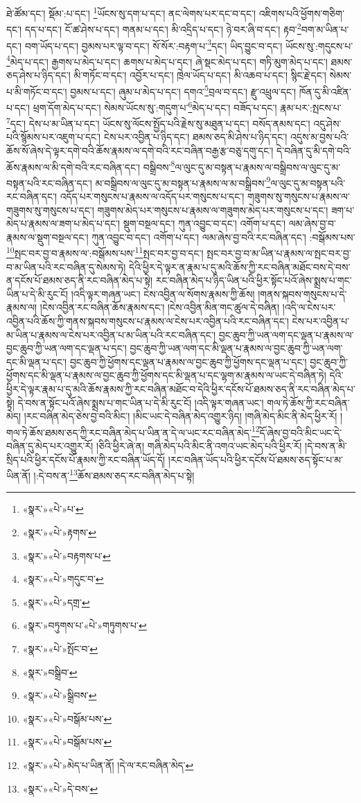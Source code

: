 ཐེ་ཚོམ་དང་། སྡོམ་:པ་དང་། \footnote{«སྣར་»«པེ་»པ་}ཡོངས་སུ་དག་པ་དང་། ནང་ལེགས་པར་དང་བ་དང་། འཇིགས་པའི་ཕྱོགས་གཅིག་དང་། དད་པ་དང་། ངོ་ཚ་ཤེས་པ་དང་། གནམ་པ་དང་། མི་འདྲིད་པ་དང་། ཉེ་བར་ཞི་བ་དང་། རྟབ་\footnote{«སྣར་»«པེ་»རྟགས་}བག་མ་ཡིན་པ་དང་། བག་ཡོད་པ་དང་། བྱམས་པར་ལྟ་བ་དང་། སོ་སོར་:བརྟག་པ་\footnote{«སྣར་»«པེ་»བརྟགས་པ་}དང་། ཡིད་བྱུང་བ་དང་། ཡོངས་སུ་:གདུངས་པ་\footnote{«སྣར་»«པེ་»གདུང་བ་}མེད་པ་དང་། རྒྱགས་པ་མེད་པ་དང་། ཆགས་པ་མེད་པ་དང་། ཞེ་སྡང་མེད་པ་དང་། གཏི་མུག་མེད་པ་དང་། ཐམས་ཅད་ཤེས་པ་ཉིད་དང་། མི་གཏོང་བ་དང་། འབྱོར་པ་དང་། ཁྲེལ་ཡོད་པ་དང་། མི་འཆབ་པ་དང་། སྙིང་རྗེ་དང་། སེམས་པ་མི་གཏོང་བ་དང་། བྱམས་པ་དང་། ཞུམ་པ་མེད་པ་དང་། དགའ་\footnote{«སྣར་»«པེ་»དགྲ་}བྲལ་བ་དང་། རྫུ་འཕྲུལ་དང་། ཁོན་དུ་མི་འཛིན་པ་དང་། ཕྲག་དོག་མེད་པ་དང་། སེམས་ཡོངས་སུ་:གདུག་པ་\footnote{«སྣར་»བཏུགས་པ་«པེ་»གཏུགས་པ་}མེད་པ་དང་། བཟོད་པ་དང་། རྣམ་པར་:སྤངས་པ་\footnote{«སྣར་»«པེ་»སྤོང་བ་}དང་། དེས་པ་མ་ཡིན་པ་དང་། ཡོངས་སུ་ལོངས་སྤྱོད་པའི་རྗེས་སུ་མཐུན་པ་དང་། བསོད་ནམས་དང་། འདུ་ཤེས་པའི་སྙོམས་པར་འཇུག་པ་དང་། ངེས་པར་འབྱིན་པ་ཉིད་དང་། ཐམས་ཅད་མི་ཤེས་པ་ཉིད་དང་། འདུས་མ་བྱས་པའི་ཆོས་སོ་ཞེས་དེ་ལྟར་དགེ་བའི་ཆོས་རྣམས་ལ་དགེ་བའི་རང་བཞིན་བརྒྱ་རྩ་བཅུ་དགུ་དང་། དེ་བཞིན་དུ་མི་དགེ་བའི་ཆོས་རྣམས་ལ་མི་དགེ་བའི་རང་བཞིན་དང་། བསྒྲིབས་\footnote{«སྣར་»བསྒྲིབ་}ལ་ལུང་དུ་མ་བསྟན་པ་རྣམས་ལ་བསྒྲིབས་ལ་ལུང་དུ་མ་བསྟན་པའི་རང་བཞིན་དང་། མ་བསྒྲིབས་ལ་ལུང་དུ་མ་བསྟན་པ་རྣམས་ལ་མ་བསྒྲིབས་\footnote{«སྣར་»«པེ་»སྒྲིབས་}ལ་ལུང་དུ་མ་བསྟན་པའི་རང་བཞིན་དང་། འདོད་པར་གསུངས་པ་རྣམས་ལ་འདོད་པར་གསུངས་པ་དང་། གཟུགས་སུ་གསུངས་པ་རྣམས་ལ་གཟུགས་སུ་གསུངས་པ་དང་། གཟུགས་མེད་པར་གསུངས་པ་རྣམས་ལ་གཟུགས་མེད་པར་གསུངས་པ་དང་། ཟག་པ་མེད་པ་རྣམས་ལ་ཟག་པ་མེད་པ་དང་། སྡུག་བསྔལ་དང་། ཀུན་འབྱུང་བ་དང་། འགོག་པ་དང་། ལམ་ཞེས་བྱ་བ་རྣམས་ལ་སྡུག་བསྔལ་དང་། ཀུན་འབྱུང་བ་དང་། འགོག་པ་དང་། ལམ་ཞེས་བྱ་བའི་རང་བཞིན་དང་། :བསྒོམས་པས་\footnote{«སྣར་»«པེ་»བསྒོམ་པས་}སྤང་བར་བྱ་བ་རྣམས་ལ་:བསྒོམས་པས་\footnote{«སྣར་»«པེ་»བསྒོམ་པས་}སྤང་བར་བྱ་བ་དང་། སྤང་བར་བྱ་བ་མ་ཡིན་པ་རྣམས་ལ་སྤང་བར་བྱ་བ་མ་ཡིན་པའི་རང་བཞིན་དུ་སེམས་ཏེ། དེའི་ཕྱིར་དེ་ལྟར་ན་རྣམ་པ་དུ་མའི་ཆོས་ཀྱི་རང་བཞིན་མཐོང་བས་དེ་བས་ན་དངོས་པོ་ཐམས་ཅད་ནི་རང་བཞིན་མེད་པ་སྟེ། རང་བཞིན་མེད་པ་ཉིད་ཡིན་པའི་ཕྱིར་སྟོང་པའོ་ཞེས་སྨྲས་པ་གང་ཡིན་པ་དེ་མི་རུང་ངོ། །འདི་ལྟར་གཞན་ཡང་། ངེས་འབྱིན་ལ་སོགས་རྣམས་ཀྱི་ཆོས། །གནས་སྐབས་གསུངས་པ་དེ་རྣམས་ལ། །ངེས་འབྱིན་རང་བཞིན་ཆོས་རྣམས་དང་། །ངེས་འབྱིན་མིན་གང་ཚུལ་དེ་བཞིན། །འདི་ལ་ངེས་པར་འབྱིན་པའི་ཆོས་ཀྱི་གནས་སྐབས་གསུངས་པ་རྣམས་ལ་ངེས་པར་འབྱིན་པའི་རང་བཞིན་དང་། ངེས་པར་འབྱིན་པ་མ་ཡིན་པ་རྣམས་ལ་ངེས་པར་འབྱིན་པ་མ་ཡིན་པའི་རང་བཞིན་དང་། བྱང་ཆུབ་ཀྱི་ཡན་ལག་དང་ལྡན་པ་རྣམས་ལ་བྱང་ཆུབ་ཀྱི་ཡན་ལག་དང་ལྡན་པ་དང་། བྱང་ཆུབ་ཀྱི་ཡན་ལག་དང་མི་ལྡན་པ་རྣམས་ལ་བྱང་ཆུབ་ཀྱི་ཡན་ལག་དང་མི་ལྡན་པ་དང་། བྱང་ཆུབ་ཀྱི་ཕྱོགས་དང་ལྡན་པ་རྣམས་ལ་བྱང་ཆུབ་ཀྱི་ཕྱོགས་དང་ལྡན་པ་དང་། བྱང་ཆུབ་ཀྱི་ཕྱོགས་དང་མི་ལྡན་པ་རྣམས་ལ་བྱང་ཆུབ་ཀྱི་ཕྱོགས་དང་མི་ལྡན་པ་དང་ལྷག་མ་རྣམས་ལ་ཡང་དེ་བཞིན་ཏེ། དེའི་ཕྱིར་དེ་ལྟར་རྣམ་པ་དུ་མའི་ཆོས་རྣམས་ཀྱི་རང་བཞིན་མཐོང་བ་དེའི་ཕྱིར་དངོས་པོ་ཐམས་ཅད་ནི་རང་བཞིན་མེད་པ་སྟེ། དེ་བས་ན་སྟོང་པའོ་ཞེས་སྨྲས་པ་གང་ཡིན་པ་དེ་མི་རུང་ངོ། །འདི་ལྟར་གཞན་ཡང་། གལ་ཏེ་ཆོས་ཀྱི་རང་བཞིན་མེད། །རང་བཞིན་མེད་ཅེས་བྱ་བའི་མིང་། །མིང་ཡང་དེ་བཞིན་མེད་འགྱུར་ཉིད། །གཞི་མེད་མིང་ནི་མེད་ཕྱིར་རོ། །གལ་ཏེ་ཆོས་ཐམས་ཅད་ཀྱི་རང་བཞིན་མེད་པ་ཡིན་ན་དེ་ལ་ཡང་རང་བཞིན་མེད་\footnote{«སྣར་»«པེ་»མེད་པ་ཡིན་ནོ། །དེ་ལ་རང་བཞིན་མེད་}དོ་ཞེས་བྱ་བའི་མིང་ཡང་དེ་བཞིན་དུ་མེད་པར་འགྱུར་རོ། །ཅིའི་ཕྱིར་ཞེ་ན། གཞི་མེད་པའི་མིང་ནི་འགའ་ཡང་མེད་པའི་ཕྱིར་རོ། །དེ་བས་ན་མི་སྲིད་པའི་ཕྱིར་དངོས་པོ་རྣམས་ཀྱི་རང་བཞིན་ཡོད་དོ། །རང་བཞིན་ཡོད་པའི་ཕྱིར་དངོས་པོ་ཐམས་ཅད་སྟོང་པ་མ་ཡིན་ནོ། །:དེ་བས་ན་\footnote{«སྣར་»«པེ་»དེ་བས་}ཆོས་ཐམས་ཅད་རང་བཞིན་མེད་པ་སྟེ། 